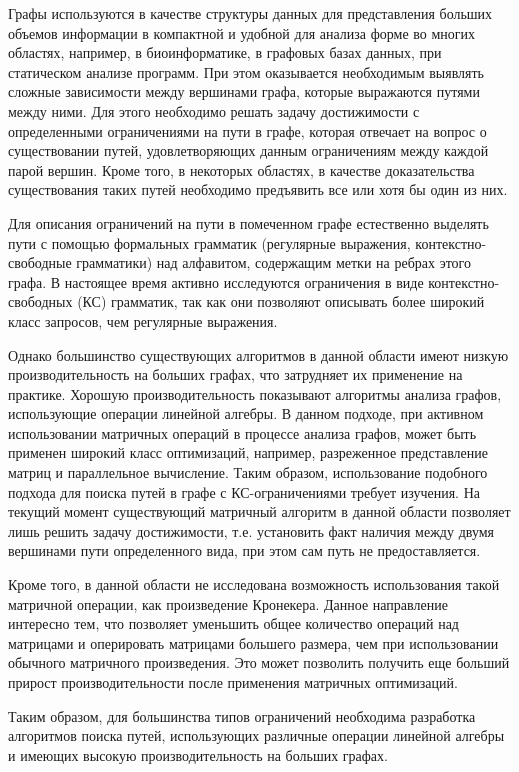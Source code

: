 
{\actuality} 
Графы используются в качестве структуры данных для представления больших объемов информации в компактной и удобной для анализа форме во многих областях, например, в биоинформатике, в графовых базах данных, при статическом анализе программ. При этом оказывается необходимым выявлять сложные зависимости между вершинами графа, которые выражаются путями между ними. Для этого необходимо решать задачу достижимости с определенными ограничениями на пути в графе, которая отвечает на вопрос о существовании путей, удовлетворяющих данным ограничениям между каждой парой вершин. Кроме того, в некоторых областях, в качестве доказательства существования таких путей необходимо предъявить все или хотя бы один из них. 


Для описания ограничений на пути в помеченном графе естественно выделять пути с помощью формальных грамматик (регулярные выражения, контекстно-свободные грамматики) над алфавитом, содержащим метки на ребрах этого графа. В настоящее время активно исследуются ограничения в виде контекстно-свободных (КС) грамматик, так как они позволяют описывать более широкий класс запросов, чем регулярные выражения.

Однако большинство существующих алгоритмов в данной области имеют низкую производительность на больших графах, что затрудняет их применение на практике. Хорошую производительность показывают алгоритмы анализа графов, использующие операции линейной алгебры. В данном подходе, при активном использовании матричных операций в процессе анализа графов, может быть применен широкий класс оптимизаций, например, разреженное представление матриц и параллельное вычисление. Таким образом, использование подобного подхода для поиска путей в графе с КС-ограничениями требует изучения. На текущий момент существующий матричный алгоритм в данной области позволяет лишь решить задачу достижимости, т.е. установить факт наличия между двумя вершинами пути определенного вида, при этом сам путь не предоставляется. 

Кроме того, в данной области не исследована возможность использования такой матричной операции, как произведение Кронекера. Данное направление интересно тем, что позволяет уменьшить общее количество операций над матрицами и оперировать матрицами большего размера, чем при использовании обычного матричного произведения. Это может позволить получить еще больший прирост производительности после применения матричных оптимизаций.

Таким образом, для большинства типов ограничений необходима разработка алгоритмов поиска путей, использующих различные операции линейной алгебры и имеющих высокую производительность на больших графах.


